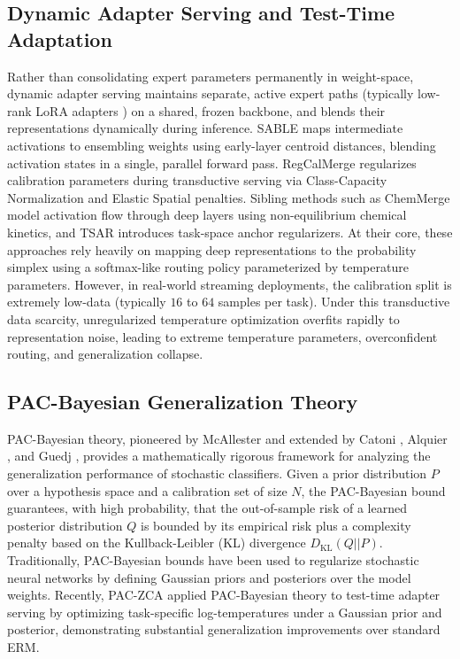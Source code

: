 \subsection{Dynamic Adapter Serving and Test-Time Adaptation}
Rather than consolidating expert parameters permanently in weight-space, dynamic adapter serving maintains separate, active expert paths (typically low-rank LoRA adapters \cite{hu2021lora}) on a shared, frozen backbone, and blends their representations dynamically during inference. SABLE \cite{sable2025} maps intermediate activations to ensembling weights using early-layer centroid distances, blending activation states in a single, parallel forward pass. RegCalMerge \cite{regcalmerge2025} regularizes calibration parameters during transductive serving via Class-Capacity Normalization and Elastic Spatial penalties. Sibling methods such as ChemMerge \cite{chemmerge2026} model activation flow through deep layers using non-equilibrium chemical kinetics, and TSAR \cite{tsar2026} introduces task-space anchor regularizers. At their core, these approaches rely heavily on mapping deep representations to the probability simplex using a softmax-like routing policy parameterized by temperature parameters. However, in real-world streaming deployments, the calibration split is extremely low-data (typically $16$ to $64$ samples per task). Under this transductive data scarcity, unregularized temperature optimization overfits rapidly to representation noise, leading to extreme temperature parameters, overconfident routing, and generalization collapse.

\subsection{PAC-Bayesian Generalization Theory}
PAC-Bayesian theory, pioneered by McAllester \cite{mcallester1999pac, mcallester2003simplified} and extended by Catoni \cite{catoni2007pac}, Alquier \cite{alquier2016properties}, and Guedj \cite{guedj2019primer}, provides a mathematically rigorous framework for analyzing the generalization performance of stochastic classifiers. Given a prior distribution $P$ over a hypothesis space and a calibration set of size $N$, the PAC-Bayesian bound guarantees, with high probability, that the out-of-sample risk of a learned posterior distribution $Q$ is bounded by its empirical risk plus a complexity penalty based on the Kullback-Leibler (KL) divergence $D_{\text{KL}}(Q || P)$. Traditionally, PAC-Bayesian bounds have been used to regularize stochastic neural networks by defining Gaussian priors and posteriors over the model weights. Recently, PAC-ZCA \cite{paczca2026} applied PAC-Bayesian theory to test-time adapter serving by optimizing task-specific log-temperatures under a Gaussian prior and posterior, demonstrating substantial generalization improvements over standard ERM. 

